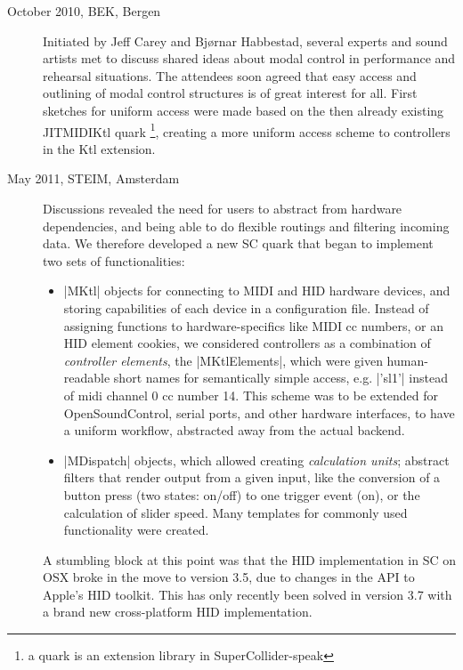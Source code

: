 \documentclass{article}
\newcommand{\todo}[1] {\emph{\textbf{TODO:} #1}}
\begin{document}
\begin{description}
	\item[October 2010, BEK, Bergen] Initiated by Jeff Carey and Bj\o{}rnar Habbestad, several experts and sound artists met to discuss shared ideas about modal control in performance and rehearsal situations.
	The attendees soon agreed that easy access and outlining of modal control structures is of great interest for all. First sketches for uniform access were made based on the then already existing JITMIDIKtl quark \footnote{a quark is an extension library in SuperCollider-speak}, creating a more uniform access scheme to controllers in the Ktl extension. 
	
	
	\item[May 2011, STEIM, Amsterdam] Discussions revealed the need for users to abstract from hardware dependencies, and being able to do flexible routings and filtering incoming data. We therefore developed a new SC quark that began to implement two sets of functionalities:
	
	\begin{itemize}
		\item |MKtl| objects for connecting to MIDI and HID hardware devices, and storing capabilities of each device in a configuration file.
		 Instead of assigning functions to hardware-specifics like MIDI cc numbers, or an HID element cookies, we considered controllers as a combination of \emph{controller elements}, the |MKtlElements|, which were given human-readable short names for semantically simple access, e.g. |'sl1'| instead of midi channel 0 cc number 14.
		 This scheme was to be extended for OpenSoundControl, serial ports, and other hardware interfaces, to have a uniform workflow, abstracted away from the actual backend.
		\item  |MDispatch| objects, which allowed creating \emph{calculation units}; abstract filters that render output from a given input, like the conversion of a button press (two states: on/off) to one trigger event (on), or the calculation of slider speed. Many templates for commonly used functionality were created.
	\end{itemize}
	
	A stumbling block at this point was that the HID implementation in SC on OSX broke in the move to version 3.5, due to changes in the API to Apple's HID toolkit. This has only recently been solved in version 3.7 with a brand new cross-platform HID implementation.
	

\end{description}
\end{document}
